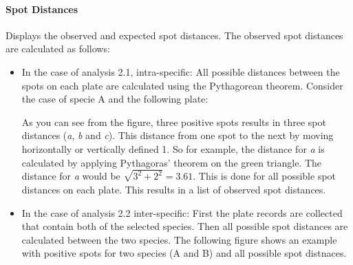 \documentclass[letterpaper,10pt,english]{sphinxmanual}
\begin{document}
\paragraph{Spot Distances}
\label{user_manual:spot-distances}
Displays the observed and expected spot distances. The observed spot
distances are calculated as follows:
\begin{itemize}
\item {} 
In the case of analysis 2.1, intra-specific: All possible distances
between the spots on each plate are calculated using the Pythagorean
theorem. Consider the case of specie A and the following plate:
\begin{quote}
\begin{figure}[htbp]
\centering

\end{figure}
\end{quote}

As you can see from the figure, three positive spots results in three
spot distances (\emph{a}, \emph{b} and \emph{c}). This distance from one spot to the next
by moving horizontally or vertically defined 1. So for example, the
distance for \emph{a} is calculated by applying Pythagoras' theorem on the
green triangle. The distance for \emph{a} would be $\sqrt{3^2 + 2^2} = 3.61$.
This is done for all possible spot distances on each plate. This
results in a list of observed spot distances.

\item {} 
In the case of analysis 2.2 inter-specific: First the plate records
are collected that contain both of the selected species. Then all
possible spot distances are calculated between the two species. The
following figure shows an example with positive spots for two species
(A and B) and all possible spot distnaces.
\begin{quote}
\begin{figure}[htbp]
\centering


\end{figure}
\end{quote}
\end{itemize}
\end{document}

